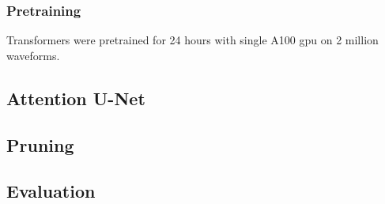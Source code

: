 \subsubsection{Pretraining}

Transformers were pretrained for 24 hours with single A100 gpu on 2 million waveforms.

\subsection{Attention U-Net}


\subsection{Pruning}




\subsection{Evaluation}


